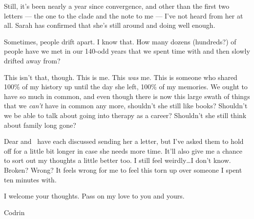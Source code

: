 Still, it's been nearly a year since convergence, and other than the first two letters — the one to the clade and the note to me — I've not heard from her at all. Sarah has confirmed that she's still around and doing well enough.

Sometimes, people drift apart. I know that. How many dozens (hundreds?) of people have we met in our 140-odd years that we spent time with and then slowly drifted away from?

This isn't that, though. This is me. This \emph{was} me. This is someone who shared 100\% of my history up until the day she left, 100\% of my memories. We ought to have so much in common, and even though there is now this large swath of things that we \emph{can't} have in common any more, shouldn't she still like books? Shouldn't we be able to talk about going into therapy as a career? Shouldn't she still think about family long gone?

Dear and \Partner\ have each discussed sending her a letter, but I've asked them to hold off for a little bit longer in case she needs more time. It'll also give me a chance to sort out my thoughts a little better too. I still feel weirdly\ldots I don't know. Broken? Wrong? It feels wrong for me to feel this torn up over someone I spent ten minutes with.

I welcome your thoughts. Pass on my love to you and yours.

Codrin
